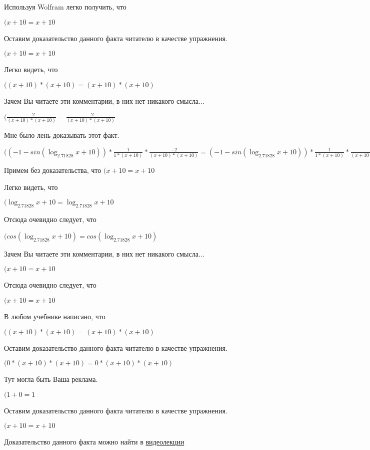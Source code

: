 \documentclass[12pt,a4paper,fleqn]{article}
\theoremstyle{definition}
\begin{document}
Используя Wolfram легко получить, что

$( x  +  10  =  x  +  10 $

Оставим доказательство данного факта читателю в качестве упражнения.

$( x  +  10  =  x  +  10 $

Легко видеть, что

$(( x  +  10 ) * ( x  +  10 ) = ( x  +  10 ) * ( x  +  10 )$

Зачем Вы читаете эти комментарии, в них нет никакого смысла...

$(\frac{ -2 }{( x  +  10 ) * ( x  +  10 )}
 = \frac{ -2 }{( x  +  10 ) * ( x  +  10 )}
$

Мне было лень доказывать этот факт.

$(( -1  - sin(\log_{ 2.71828 }{ x  +  10 })) * \frac{ 1 }{ 1  * ( x  +  10 )}
 * \frac{ -2 }{( x  +  10 ) * ( x  +  10 )}
 = ( -1  - sin(\log_{ 2.71828 }{ x  +  10 })) * \frac{ 1 }{ 1  * ( x  +  10 )}
 * \frac{ -2 }{( x  +  10 ) * ( x  +  10 )}
$

Примем без доказательства, что
$( x  +  10  =  x  +  10 $

Легко видеть, что

$(\log_{ 2.71828 }{ x  +  10 } = \log_{ 2.71828 }{ x  +  10 }$

Отсюда очевидно следует, что

$(cos(\log_{ 2.71828 }{ x  +  10 }) = cos(\log_{ 2.71828 }{ x  +  10 })$

Зачем Вы читаете эти комментарии, в них нет никакого смысла...

$( x  +  10  =  x  +  10 $

Отсюда очевидно следует, что

$( x  +  10  =  x  +  10 $

В любом учебнике написано, что

$(( x  +  10 ) * ( x  +  10 ) = ( x  +  10 ) * ( x  +  10 )$

Оставим доказательство данного факта читателю в качестве упражнения.

$( 0  * ( x  +  10 ) * ( x  +  10 ) =  0  * ( x  +  10 ) * ( x  +  10 )$

Тут могла быть Ваша реклама.

$( 1  +  0  =  1 $

Оставим доказательство данного факта читателю в качестве упражнения.

$( x  +  10  =  x  +  10 $

Доказательство данного факта можно найти в \href{https://www.youtube.com/watch?v=dQw4w9WgXcQ}{видеолекции}
\end{document}
